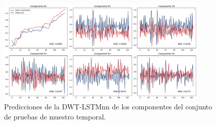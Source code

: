 \begin{figure}[H]
    \centering
    \includegraphics[width=0.9\textwidth]{Figuras/proceso_de_entrenamiento/grafs_c_prueba/DWT_NARNN/estandar/DWT_NARNN.png}
    \caption{Predicciones de la DWT-LSTMnn de los componentes del conjunto de pruebas de muestro temporal.} 
    \label{fig:c_prueba_componentes_DWT_NARNN}
\end{figure}

